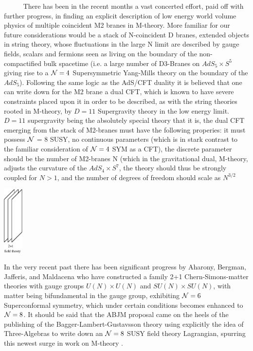 \documentclass[12pt]{article}
\def\calN{{\cal N}}
\begin{document}
$\qquad \,\,\,$ There has been in the recent months a vast concerted effort, paid off with further progress, in finding an explicit description of low energy world volume physics of multiple coincident M2 branes in M-theory. More familiar for our future considerations would be a stack of N-coincident D branes, extended objects in string theory, whose fluctuations in the large N limit are described by gauge fields, scalars and fermions seen as living on the boundary of the non-compactified bulk spacetime (i.e. a large number of D3-Branes on $AdS_5 \times S^5$ giving rise to a $\calN = 4$ Supersymmetric Yang-Mills theory on the boundary of the $AdS_5$). Following the same logic as the AdS/CFT duality it is believed that one can write down for the M2 brane a dual CFT, which is known to have severe constraints placed upon it in order to be described, as with the string theories rooted in M-theory, by $D=11$ Supergravity theory in the low energy limit.  $D=11$ supergravity being the absolutely special theory that it is, the dual CFT emerging from the stack of M2-branes must have the following properies:  
it must possess $\calN$ = 8 SUSY, no continuous parameters (which is in stark contrast to the familiar consideration of $\calN=4$ SYM as a CFT), the discrete parameter should be the number of M2-branes N (which in the gravitational dual, M-theory, adjusts the curvature of the $AdS_4 \times S^7$, the theory should thus be strongly coupled for $N>1$, and the number of degrees of freedom should scale as $N^{3/2}$
\begin{center}
\includegraphics[height=3.5cm]{pic1.eps}
\end{center}

In the very recent past there has been significant progress by Aharony, Bergman, Jafferis, and Maldacena \cite{ABJM} who have constructed a family 2+1 Chern-Simons-matter theories with gauge groups $U(N)\times U(N)$ and $SU(N) \times SU(N)$, with matter being bifundamental in the gauge group, exhibiting $\calN =6$ Superconformal symmetry, which under certain conditions becomes enhanced to $\calN=8$. It should be said that the ABJM proposal came on the heels of the publishing of the Bagger-Lambert-Gustavsson theory using explicitly the idea of Three-Algebras to write down an $\calN =8$ SUSY field theory Lagrangian, spurring this newest surge in work on M-theory  \cite{BL,Gus}.
\end{document}
